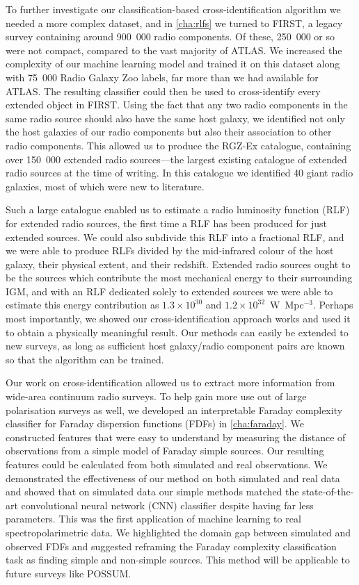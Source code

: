 \documentclass[11pt, a4paper]{book}
\begin{document}
To further investigate our classification-based cross-identification algorithm we \linebreak needed a more complex dataset, and in \autoref{cha:rlfs} we turned to FIRST, a legacy survey containing around 900~000 radio components. Of these, 250~000 or so were not compact, compared to the vast majority of ATLAS. We increased the complexity of our machine learning model and trained it on this dataset along with 75~000 Radio Galaxy Zoo labels, far more than we had available for ATLAS. The resulting classifier could then be used to cross-identify every extended object in FIRST. Using the fact that any two radio components in the same radio source should also have the same host galaxy, we identified not only the host galaxies of our radio components but also their association to other radio components. This allowed us to produce the RGZ-Ex catalogue, containing over 150~000 extended radio sources---the largest existing catalogue of extended radio sources at the time of writing. In this catalogue we identified 40 giant radio galaxies, most of which were new to literature.

Such a large catalogue enabled us to estimate a radio luminosity function (RLF) for extended radio sources, the first time a RLF has been produced for just extended sources. We could also subdivide this RLF into a fractional RLF, and we were able to produce RLFs divided by the mid-infrared colour of the host galaxy, their physical extent, and their redshift. Extended radio sources ought to be the sources which contribute the most mechanical energy to their surrounding IGM, and with an RLF dedicated solely to extended sources we were able to estimate this energy contribution as $1.3 \times 10^{30}$ and $1.2 \times 10^{32}$~W~Mpc$^{-3}$. Perhaps most importantly, we showed our cross-identification approach works and used it to obtain a physically meaningful result. Our methods can easily be extended to new surveys, as long as sufficient host galaxy/radio component pairs are known so that the algorithm can be trained.

Our work on cross-identification allowed us to extract more information from wide-area continuum radio surveys. To help gain more use out of large polarisation surveys as well, we developed an interpretable Faraday complexity classifier for Faraday dispersion functions (FDFs) in \autoref{cha:faraday}. We constructed features that were easy to understand by measuring the distance of observations from a simple model of Faraday simple sources. Our resulting features could be calculated from both simulated and real observations. We demonstrated the effectiveness of our method on both simulated and real data and showed that on simulated data our simple methods matched the state-of-the-art convolutional neural network (CNN) classifier despite having far less parameters. This was the first application of machine learning to real spectropolarimetric data. We highlighted the domain gap between simulated and observed FDFs and suggested reframing the Faraday complexity classification task as finding simple and non-simple sources. This method will be applicable to future surveys like POSSUM.
\end{document}
